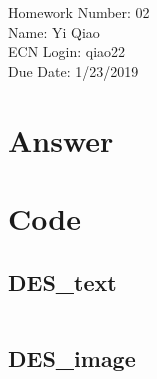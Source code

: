 \documentclass[11pt]{article}
\begin{document}
\noindent Homework Number: 02\\
Name: Yi Qiao\\
ECN Login: qiao22\\
Due Date: 1/23/2019\\
\section*{Answer}

\section*{Code}

\subsection*{DES\_text}

\inputminted{python}{DES_text.py}

\pagebreak

\subsection*{DES\_image}
\inputminted{python}{DES_image.py}
\end{document}

